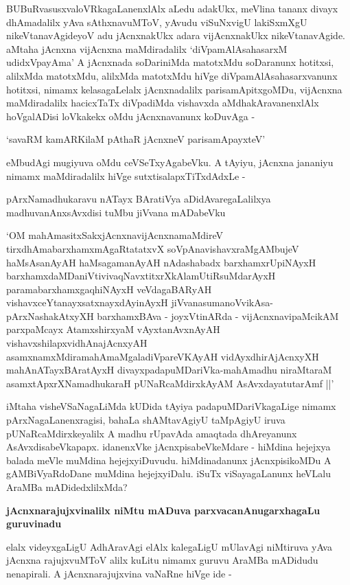 BUBuRvasusxvaloVRkagaLanenxlAlx aLedu adakUkx, meVlina tananx divayx dhAma\-dalilx yAva sAthxna\-vuM\-ToV, yAvudu viSuNxvigU lakiSxmXgU nikeVtanavAgideyoV adu jAcnxnakUkx adara vijAcnxnakUkx nikeVtana\-vAgide. aMtaha jAcnxna vijAcnxna maMdiradalilx `diVpamAlAsahasarxM udidxVpayAma' A jAcnxnada soDari\-niMda ma\-totxMdu soDaranunx hotitxsi, alilxMda matotxMdu, alilxMda matotxMdu hiVge diVpamAlAsahasarx\-vanunx hotitxsi, nimamx kelasagaLelalx jAcnxnadalilx parisamApitxgoMDu, vijAcnxna maMdiradalilx hacicxTaTx diVpadiMda vishavxda aMdhakAravanenxlAlx hoVgalADisi loVkakekx oMdu jAcnxnavanunx koDuvAga - 

\begin{shloka}
`savaRM kamARKilaM pAthaR jAcnxneV parisamApayxteV'
\end{shloka}

\noindent
eMbudAgi mugiyuva oMdu ceVSeTxyAgabeVku. A tAyiyu, jAcnxna jananiyu nimamx maMdira\-dalilx hiVge sutxtisalapxTiTxdAdxLe -

pArxNamadhukaravu nATayx BAratiVya aDidAvaregaLalilxya madhuvanAnxsAvxdisi tuMbu jiVvana mADa\-beVku

`OM mahAmasitxSakxjAcnxnavijAcnxnamaMdireV\label{81} tirxdhAmabarxhamxmAgaRtatatxvX soVpAna\-vishavxraMgAMbujeV haM\-sAsanAyAH haMsagamanAyAH nAdashabadx barxhamxrUpiNAyxH barxhamxdaMDaniVtivivaqNavxtitxrXkAlamUtiRsuMda\-rAyxH paramabarxhamxgaqhiNAyxH veVda\break\-gaBARyAH vishavxceYtanayxsatxnayxdAyinAyxH jiVvanasumanoVvikAsa-pArxNasha\-kAtxyXH barxhamx\-BAva - joyxVtinARda - vijAcnxnavipaMcikAM parxpaMcayx AtamxshirxyaM vAyxtanAvxnAyAH vishavxshilapxvi\-dhAna\-jAcnxyAH asamxnamxMdiramahAmaMgaladiVpareVKAyAH vidAyxdhi\break\-rAjAcnxyXH mahAnATayxBAratAyxH divayx\-pada\-puMDariVka-mahAmadhu niraMtaraM asamx\-tApxrXNamadhukaraH pUNaRcaMdirxkAyAM AsAvxdayatuta\-rA\-mf ||'

iMtaha visheVSaNagaLiMda kUDida tAyiya padapuMDariVkagaLige nimamx pArxNa\-gaLanenxragisi, bahaLa shAMta\-vAgiyU taMpAgiyU iruva pUNaRcaMdirxkeyalilx A madhu rUpavAda amaqtada dhAre\-yanunx A\-sAvx\-disabeVkapapx. idanenxVke jAcnxpisabeVkeMdare - hiMdina hejejxya balada meVle muMdina hejejxyiDu\-vudu. \-hiMdinadanunx jAcnxpisikoMDu A gAMBiVyaRdoDane muMdina hejejxyiDalu. iSuTx viSaya\-gaLanunx heVLalu AraMBa mADidedxlilxMda?

{\bigskip
\noindent
{\large\bf jAcnxnarajujxvinalilx niMtu mADuva parxvacanAnugarxhagaLu guruvinadu}}\label{page82}
\medskip

\noindent
elalx videyxgaLigU AdhAravAgi elAlx kalegaLigU mUlavAgi niMtiruva yAva jAcnxna rajujxvuMToV alilx kuLitu nimamx guruvu AraMBa mADidudu nenapirali. A jAcnxnarajujxvina vaNaRne hiVge ide - 

